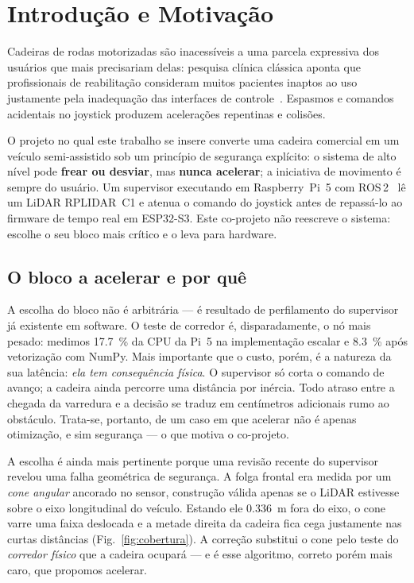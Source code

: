 \documentclass[conference]{IEEEtran}
\begin{document}
\section{Introdu\c{c}\~ao e Motiva\c{c}\~ao}

Cadeiras de rodas motorizadas s\~ao inacess\'iveis a uma parcela expressiva dos
usu\'arios que mais precisariam delas: pesquisa cl\'inica cl\'assica aponta que
profissionais de reabilita\c{c}\~ao consideram muitos pacientes inaptos ao uso
justamente pela inadequa\c{c}\~ao das interfaces de controle~\cite{fehr2000}.
Espasmos e comandos acidentais no joystick produzem acelera\c{c}\~oes repentinas
e colis\~oes.

O projeto no qual este trabalho se insere converte uma cadeira comercial em um
ve\'iculo semi-assistido sob um princ\'ipio de seguran\c{c}a expl\'icito: o
sistema de alto n\'ivel pode \textbf{frear ou desviar}, mas \textbf{nunca
acelerar}; a iniciativa de movimento \'e sempre do usu\'ario. Um supervisor
executando em Raspberry~Pi~5 com ROS\,2~\cite{ros2docs} l\^e um LiDAR RPLIDAR~C1 e
atenua o comando do joystick antes de repass\'a-lo ao firmware de tempo real em
ESP32-S3. Este co-projeto n\~ao reescreve o sistema: escolhe o seu bloco mais
cr\'itico e o leva para hardware.

\subsection{O bloco a acelerar e por qu\^e}

A escolha do bloco n\~ao \'e arbitr\'aria --- \'e resultado de perfilamento do
supervisor j\'a existente em software. O teste de corredor \'e, disparadamente, o
n\'o mais pesado: medimos \SI{17.7}{\percent} da CPU da Pi~5 na implementa\c{c}\~ao
escalar e \SI{8.3}{\percent} ap\'os vetoriza\c{c}\~ao com NumPy. Mais importante
que o custo, por\'em, \'e a natureza da sua lat\^encia: \emph{ela tem
consequ\^encia f\'isica}. O supervisor s\'o corta o comando de avan\c{c}o; a
cadeira ainda percorre uma dist\^ancia por in\'ercia. Todo atraso entre a chegada
da varredura e a decis\~ao se traduz em cent\'imetros adicionais rumo ao
obst\'aculo. Trata-se, portanto, de um caso em que acelerar n\~ao \'e apenas
otimiza\c{c}\~ao, e sim seguran\c{c}a --- o que motiva o co-projeto.

A escolha \'e ainda mais pertinente porque uma revis\~ao recente do supervisor
revelou uma falha geom\'etrica de seguran\c{c}a. A folga frontal era medida por um
\emph{cone angular} ancorado no sensor, constru\c{c}\~ao v\'alida apenas se o
LiDAR estivesse sobre o eixo longitudinal do ve\'iculo. Estando ele
\SI{0.336}{\metre} fora do eixo, o cone varre uma faixa deslocada e a metade
direita da cadeira fica cega justamente nas curtas dist\^ancias
(Fig.~\ref{fig:cobertura}). A corre\c{c}\~ao substitui o cone pelo teste do
\emph{corredor f\'isico} que a cadeira ocupar\'a --- e \'e esse algoritmo,
correto por\'em mais caro, que propomos acelerar.
\end{document}
